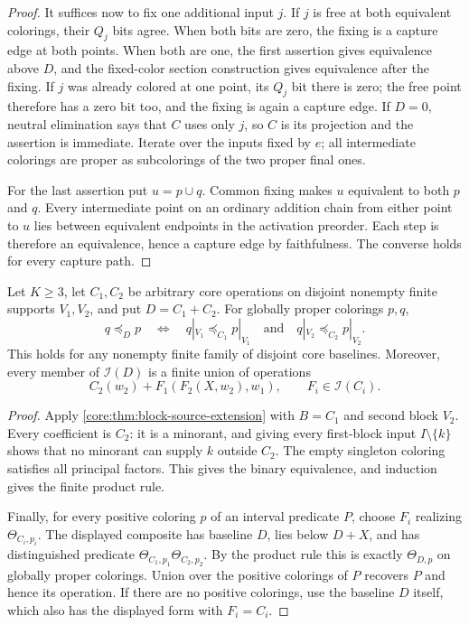 \begin{proof}
It suffices now to fix one additional input $j$. If $j$ is free at
both equivalent colorings, their $Q_j$ bits agree. When both bits
are zero, the fixing is a capture edge at both points. When both
are one, the first assertion gives equivalence above $D$, and the
fixed-color section construction gives equivalence after the fixing.
If $j$ was already colored at one point, its $Q_j$ bit there is zero;
the free point therefore has a zero bit too, and the fixing is again
a capture edge. If $D=0$, neutral elimination says that $C$ uses
only $j$, so $C$ is its projection and the assertion is immediate.
Iterate over the inputs fixed by $e$; all intermediate colorings
are proper as subcolorings of the two proper final ones.

For the last assertion put $u=p\cup q$. Common fixing makes $u$
equivalent to both $p$ and $q$. Every intermediate point on an
ordinary addition chain from either point to $u$ lies between
equivalent endpoints in the activation preorder. Each step is
therefore an equivalence, hence a capture edge by faithfulness.
The converse holds for every capture path.
\end{proof}



\begin{theorem}
\label{core:thm:disjoint-activation-product}
Let $K\geq3$, let $C_1,C_2$ be arbitrary core operations on disjoint
nonempty finite supports $V_1,V_2$, and put $D=C_1+C_2$.
For globally proper colorings $p,q$,
\[
 q\preceq_D p\quad\Longleftrightarrow\quad
 q|_{V_1}\preceq_{C_1}p|_{V_1}
 \quad\text{and}\quad
 q|_{V_2}\preceq_{C_2}p|_{V_2}.
\]
This holds for any nonempty finite family of disjoint core baselines.
Moreover, every member of $\mathcal I(D)$ is a finite union of operations
\[
 C_2(w_2)+F_1(F_2(X,w_2),w_1),\qquad F_i\in\mathcal I(C_i).
\]
\end{theorem}
\begin{proof}
Apply \cref{core:thm:block-source-extension} with $B=C_1$ and second
block $V_2$. Every coefficient is $C_2$: it is a minorant, and giving
every first-block input $I\setminus\{k\}$ shows that no minorant can
supply $k$ outside $C_2$. The empty singleton coloring satisfies all
principal factors. This gives the binary equivalence, and induction
gives the finite product rule.

Finally, for every positive coloring $p$ of an interval predicate $P$,
choose $F_i$ realizing $\Theta_{C_i,p_i}$. The displayed composite
has baseline $D$, lies below $D+X$, and has distinguished predicate
$\Theta_{C_1,p_1}\Theta_{C_2,p_2}$. By the product rule this is
exactly $\Theta_{D,p}$ on globally proper colorings. Union over the
positive colorings of $P$ recovers $P$ and hence its operation.
If there are no positive colorings, use the baseline $D$ itself,
which also has the displayed form with $F_i=C_i$.
\end{proof}

